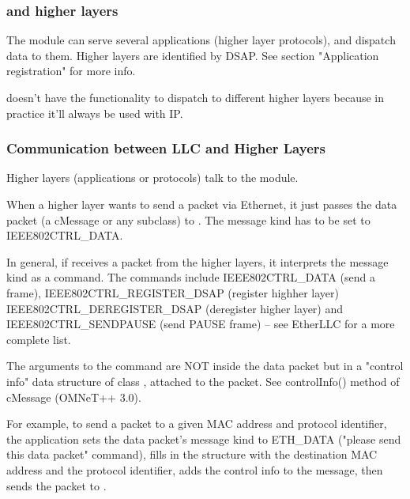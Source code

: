 
\subsubsection{ and higher layers}

The  module can serve several applications (higher layer protocols),
and dispatch data to them. Higher layers are identified by DSAP.
See section "Application registration" for more info.

 doesn't have the functionality to dispatch to different
higher layers because in practice it'll always be used with IP.

\subsubsection{Communication between LLC and Higher Layers}

Higher layers (applications or protocols) talk to the  module.

When a higher layer wants to send a packet via Ethernet, it just
passes the data packet (a cMessage or any subclass) to .
The message kind has to be set to IEEE802CTRL\_DATA.

In general, if  receives a packet from the higher layers,
it interprets the message kind as a command. The commands include
IEEE802CTRL\_DATA (send a frame), IEEE802CTRL\_REGISTER\_DSAP (register highher layer)
IEEE802CTRL\_DEREGISTER\_DSAP (deregister higher layer) and IEEE802CTRL\_SENDPAUSE
(send PAUSE frame) -- see EtherLLC for a more complete list.

The arguments to the command are NOT inside the data packet but
in a "control info" data structure of class , attached to
the packet. See controlInfo() method of cMessage (OMNeT++ 3.0).

For example, to send a packet to a given MAC address and protocol
identifier, the application sets the data packet's message kind
to ETH\_DATA ("please send this data packet" command),
fills in the  structure with the destination MAC address and
the protocol identifier, adds the control info to the message, then sends
the packet to .

